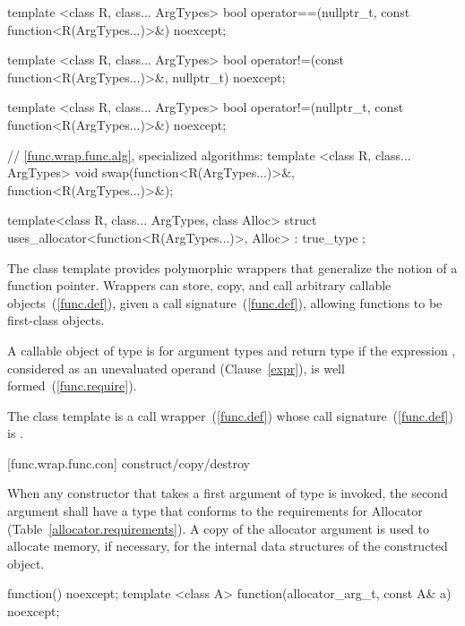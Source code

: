 \begin{codeblock}
{  template <class R, class... ArgTypes>
    bool operator==(nullptr_t, const function<R(ArgTypes...)>&) noexcept;

  template <class R, class... ArgTypes>
    bool operator!=(const function<R(ArgTypes...)>&, nullptr_t) noexcept;

  template <class R, class... ArgTypes>
    bool operator!=(nullptr_t, const function<R(ArgTypes...)>&) noexcept;

  // \ref{func.wrap.func.alg}, specialized algorithms:
  template <class R, class... ArgTypes>
    void swap(function<R(ArgTypes...)>&, function<R(ArgTypes...)>&);

  template<class R, class... ArgTypes, class Alloc>
    struct uses_allocator<function<R(ArgTypes...)>, Alloc>
      : true_type { };
}
\end{codeblock}

\pnum
The  class template provides polymorphic wrappers that
generalize the notion of a function pointer. Wrappers can store, copy,
and call arbitrary callable objects~(\ref{func.def}), given a call
signature~(\ref{func.def}), allowing functions to be first-class objects.

\pnum
{}%
A callable object  of type 
is  for argument
types 
and return type 
if the expression
,
considered as an unevaluated operand (Clause~\ref{expr}), is
well formed~(\ref{func.require}).

\pnum
The  class template is a call
wrapper~(\ref{func.def}) whose call signature~(\ref{func.def})
is .

[func.wrap.func.con]{ construct/copy/destroy}

\pnum
When any  constructor that takes a first argument of type
 is invoked, the second argument shall have a type that conforms
to the requirements for Allocator (Table~\ref{allocator.requirements}). A copy of the
allocator argument is used to allocate memory, if necessary, for the internal data
structures of the constructed  object.

\begin{itemdecl}
function() noexcept;
template <class A> function(allocator_arg_t, const A& a) noexcept;
\end{itemdecl}

